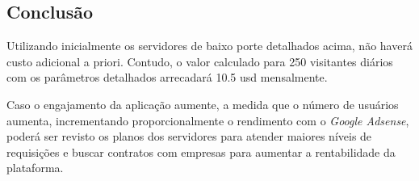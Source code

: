 \subsection{Conclusão}
Utilizando inicialmente os servidores de baixo porte detalhados acima, não haverá custo adicional a priori.
Contudo, o valor calculado para 250 visitantes diários com os parâmetros detalhados arrecadará 10.5 \acs{usd} mensalmente.

Caso o engajamento da aplicação aumente, a medida que o número de usuários aumenta,
incrementando proporcionalmente o rendimento com o \emph{Google Adsense}, poderá ser revisto os planos dos
servidores para atender maiores níveis de requisições e buscar contratos com empresas para aumentar 
a rentabilidade da plataforma.


